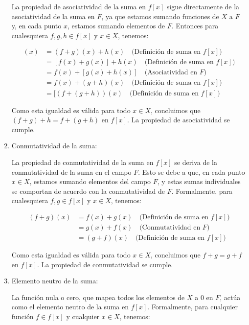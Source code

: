 \begin{enumerate}
    La propiedad de asociatividad de la suma en $f[x]$ sigue directamente de la asociatividad de la suma en $F$, ya que estamos sumando funciones de $X$ a $F$ y, en cada punto $x$, estamos sumando elementos de $F$. Entonces para cualesquiera $f, g, h \in f[x]$ y $x \in X$, tenemos:
    
    \begin{align*}
        [(f + g) + h](x) &= (f + g)(x) + h(x) \quad \text{(Definición de suma en } f[x]\text{)} \\
        &= [f(x) + g(x)] + h(x) \quad \text{(Definición de suma en } f[x]\text{)} \\
        &= f(x) + [g(x) + h(x)] \quad \text{(Asociatividad en } F\text{)} \\
        &= f(x) + (g + h)(x) \quad \text{(Definición de suma en } f[x]\text{)} \\
        &= [(f + (g + h))(x) \quad \text{(Definición de suma en } f[x]\text{)}
    \end{align*}
    
    Como esta igualdad es válida para todo $x \in X$, concluimos que $(f + g) + h = f + (g + h)$ en $f[x]$. La propiedad de asociatividad se cumple.

    \item Conmutatividad de la suma: 
    
    La propiedad de conmutatividad de la suma en $f[x]$ se deriva de la conmutatividad de la suma en el campo $F$. Esto se debe a que, en cada punto $x \in X$, estamos sumando elementos del campo $F$, y estas sumas individuales se comportan de acuerdo con la conmutatividad de $F$. Formalmente, para cualesquiera $f, g \in f[x]$ y $x \in X$, tenemos:
    
    \begin{align*}
        (f + g)(x) &= f(x) + g(x) \quad \text{(Definición de suma en } f[x]\text{)} \\
        &= g(x) + f(x) \quad \text{(Conmutatividad en } F\text{)} \\
        &= (g + f)(x) \quad \text{(Definición de suma en } f[x]\text{)}
    \end{align*}
    
    Como esta igualdad es válida para todo $x \in X$, concluimos que $f + g = g + f$ en $f[x]$. La propiedad de conmutatividad se cumple.

    \item Elemento neutro de la suma: 
    
    La función nula o cero, que mapea todos los elementos de $X$ a $0$ en $F$, actúa como el elemento neutro de la suma en $f[x]$. Formalmente, para cualquier función $f \in f[x]$ y cualquier $x \in X$, tenemos:
    

\end{enumerate}
